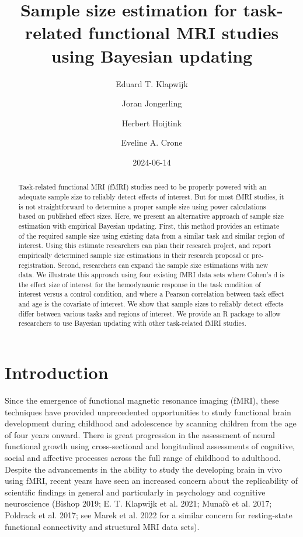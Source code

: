 \documentclass[
  letterpaper,
  DIV=11,
  numbers=noendperiod]{scrartcl}
\title{Sample size estimation for task-related functional MRI studies
using Bayesian updating}
\author{Eduard T. Klapwijk \and Joran Jongerling \and Herbert
Hoijtink \and Eveline A. Crone}
\date{2024-06-14}
\begin{document}
\maketitle
\begin{abstract}
Task-related functional MRI (fMRI) studies need to be properly powered
with an adequate sample size to reliably detect effects of interest. But
for most fMRI studies, it is not straightforward to determine a proper
sample size using power calculations based on published effect sizes.
Here, we present an alternative approach of sample size estimation with
empirical Bayesian updating. First, this method provides an estimate of
the required sample size using existing data from a similar task and
similar region of interest. Using this estimate researchers can plan
their research project, and report empirically determined sample size
estimations in their research proposal or pre-registration. Second,
researchers can expand the sample size estimations with new data. We
illustrate this approach using four existing fMRI data sets where
Cohen's d is the effect size of interest for the hemodynamic response in
the task condition of interest versus a control condition, and where a
Pearson correlation between task effect and age is the covariate of
interest. We show that sample sizes to reliably detect effects differ
between various tasks and regions of interest. We provide an R package
to allow researchers to use Bayesian updating with other task-related
fMRI studies.
\end{abstract}

\section{Introduction}\label{introduction}

Since the emergence of functional magnetic resonance imaging (fMRI),
these techniques have provided unprecedented opportunities to study
functional brain development during childhood and adolescence by
scanning children from the age of four years onward. There is great
progression in the assessment of neural functional growth using
cross-sectional and longitudinal assessments of cognitive, social and
affective processes across the full range of childhood to adulthood.
Despite the advancements in the ability to study the developing brain in
vivo using fMRI, recent years have seen an increased concern about the
replicability of scientific findings in general and particularly in
psychology and cognitive neuroscience (Bishop 2019; E. T. Klapwijk et
al. 2021; Munafò et al. 2017; Poldrack et al. 2017; see Marek et al.
2022 for a similar concern for resting-state functional connectivity and
structural MRI data sets).
\end{document}
